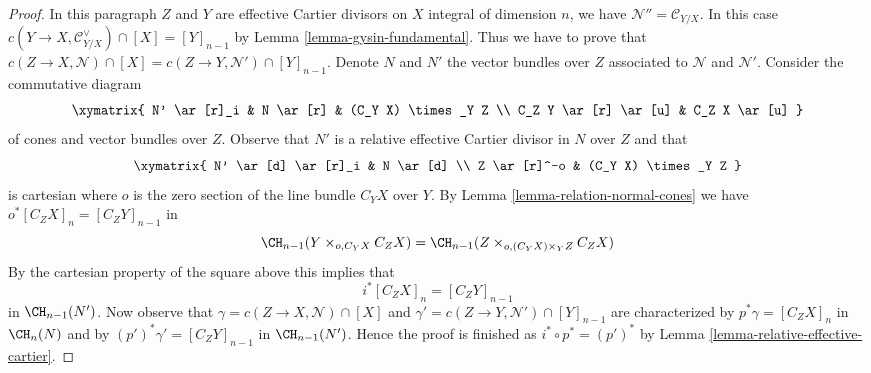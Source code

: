 \begin{proof}
\medskip\noindent
In this paragraph $Z$ and $Y$ are effective Cartier divisors on $X$
integral of dimension $n$, we have $\mathcal{N}'' = \mathcal{C}_{Y/X}$.
In this case $c(Y \to X, \mathcal{C}_{Y/X}^\vee) \cap [X] = [Y]_{n - 1}$ by
Lemma \ref{lemma-gysin-fundamental}. Thus we have to prove that
$c(Z \to X, \mathcal{N}) \cap [X] = c(Z \to Y, \mathcal{N}') \cap [Y]_{n - 1}$.
Denote $N$ and $N'$ the vector bundles over $Z$ associated to
$\mathcal{N}$ and $\mathcal{N}'$. Consider the commutative diagram
$$
\xymatrix{
N' \ar[r]_i &
N \ar[r] &
(C_Y X) \times_Y Z \\
C_Z Y \ar[r] \ar[u] &
C_Z X \ar[u]
}
$$
of cones and vector bundles over $Z$. Observe that $N'$ is a relative
effective Cartier divisor in $N$ over $Z$ and that
$$
\xymatrix{
N' \ar[d] \ar[r]_i & N \ar[d] \\
Z \ar[r]^-o & (C_Y X) \times_Y Z
}
$$
is cartesian where $o$ is the zero section of the line bundle
$C_Y X$ over $Y$. By
Lemma \ref{lemma-relation-normal-cones} we have $o^*[C_ZX]_n = [C_Z Y]_{n - 1}$
in
$$
\CH_{n - 1}(Y \times_{o, C_Y X} C_ZX) =
\CH_{n - 1}(Z \times_{o, (C_Y X) \times_Y Z} C_ZX)
$$
By the cartesian property of
the square above this implies that
$$
i^*[C_ZX]_n = [C_Z Y]_{n - 1}
$$
in $\CH_{n - 1}(N')$. Now observe that
$\gamma = c(Z \to X, \mathcal{N}) \cap [X]$ and
$\gamma' = c(Z \to Y, \mathcal{N}') \cap [Y]_{n - 1}$
are characterized by $p^*\gamma = [C_Z X]_n$ in $\CH_n(N)$
and by $(p')^*\gamma' = [C_Z Y]_{n - 1}$ in $\CH_{n - 1}(N')$.
Hence the proof is finished as $i^* \circ p^* = (p')^*$ by
Lemma \ref{lemma-relative-effective-cartier}.
\end{proof}